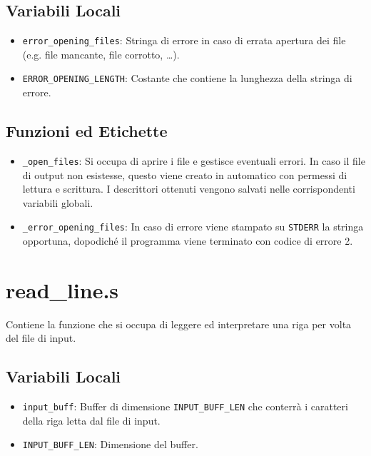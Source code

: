 \documentclass[a4paper,11pt]{article}
\newcommand{\itemtt}[1]{\item \texttt{#1}}
\begin{document}
	\subsection{Variabili Locali} 
	\begin{itemize}
		\itemtt{error\_opening\_files}: Stringa di errore in caso di errata apertura dei file (e.g. file mancante, file corrotto, \ldots).
		\itemtt{ERROR\_OPENING\_LENGTH}: Costante che contiene la lunghezza della stringa di errore.
	\end{itemize}
	
	\subsection{Funzioni ed Etichette}
	\begin{itemize}
		\itemtt{\_open\_files}: Si occupa di aprire i file e gestisce eventuali errori. In caso il file di output non esistesse, questo viene creato in automatico con permessi di lettura e scrittura. I descrittori ottenuti vengono salvati nelle corrispondenti variabili globali. 
		\itemtt{\_error\_opening\_files}: In caso di errore viene stampato su \texttt{STDERR} la stringa opportuna, dopodiché il programma viene terminato con codice di errore 2. 
	\end{itemize}
	
	\section{read\_line.s}
	Contiene la funzione che si occupa di leggere ed interpretare una riga per volta del file di input.
	\subsection{Variabili Locali}
	\begin{itemize}
		\itemtt{input\_buff}: Buffer di dimensione \texttt{INPUT\_BUFF\_LEN} che conterrà i caratteri della riga letta dal file di input.
		\itemtt{INPUT\_BUFF\_LEN}: Dimensione del buffer.
	\end{itemize}
	
\end{document}
